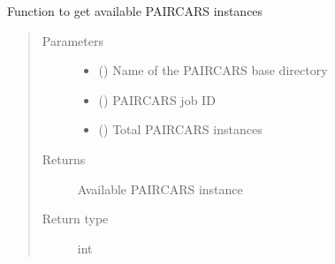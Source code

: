 \documentclass[letterpaper,10pt,english]{sphinxmanual}
\begin{document}
\begin{fulllineitems}
\label{\detokenize{paircars:paircars.basic_func.get_available_paircars_instance}}
\sphinxAtStartPar
Function to get available P\sphinxhyphen{}AIRCARS instances
\begin{quote}\begin{description}
\item[{Parameters}] \leavevmode\begin{itemize}
\item {} 
\sphinxAtStartPar
{} () \textendash{} Name of the P\sphinxhyphen{}AIRCARS base directory

\item {} 
\sphinxAtStartPar
{} () \textendash{} P\sphinxhyphen{}AIRCARS job ID

\item {} 
\sphinxAtStartPar
{} () \textendash{} Total P\sphinxhyphen{}AIRCARS instances

\end{itemize}

\item[{Returns}] \leavevmode
\sphinxAtStartPar
Available P\sphinxhyphen{}AIRCARS instance

\item[{Return type}] \leavevmode
\sphinxAtStartPar
int

\end{description}\end{quote}

\end{fulllineitems}

\end{document}
